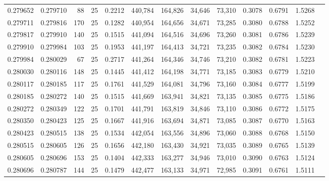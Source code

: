 \begin{tabular}{rrrrrrrrrrrrr}
0.279652 & 0.279710 &    88 &  25 &                                     0.2212 & 440,784 & 164,826 &  34,646 &  73,310 & 0.3078 & 0.6791 & 1.5268 \\
0.279711 & 0.279816 &   170 &  25 &                                     0.1282 & 440,954 & 164,656 &  34,671 &  73,285 & 0.3080 & 0.6788 & 1.5252 \\
0.279817 & 0.279910 &   140 &  25 &                                     0.1515 & 441,094 & 164,516 &  34,696 &  73,260 & 0.3081 & 0.6786 & 1.5239 \\
0.279910 & 0.279984 &   103 &  25 &                                     0.1953 & 441,197 & 164,413 &  34,721 &  73,235 & 0.3082 & 0.6784 & 1.5230 \\
0.279984 & 0.280029 &    67 &  25 &                                     0.2717 & 441,264 & 164,346 &  34,746 &  73,210 & 0.3082 & 0.6781 & 1.5223 \\
0.280030 & 0.280116 &   148 &  25 &                                     0.1445 & 441,412 & 164,198 &  34,771 &  73,185 & 0.3083 & 0.6779 & 1.5210 \\
0.280117 & 0.280185 &   117 &  25 &                                     0.1761 & 441,529 & 164,081 &  34,796 &  73,160 & 0.3084 & 0.6777 & 1.5199 \\
0.280185 & 0.280272 &   140 &  25 &                                     0.1515 & 441,669 & 163,941 &  34,821 &  73,135 & 0.3085 & 0.6775 & 1.5186 \\
0.280272 & 0.280349 &   122 &  25 &                                     0.1701 & 441,791 & 163,819 &  34,846 &  73,110 & 0.3086 & 0.6772 & 1.5175 \\
0.280350 & 0.280423 &   125 &  25 &                                     0.1667 & 441,916 & 163,694 &  34,871 &  73,085 & 0.3087 & 0.6770 & 1.5163 \\
0.280423 & 0.280515 &   138 &  25 &                                     0.1534 & 442,054 & 163,556 &  34,896 &  73,060 & 0.3088 & 0.6768 & 1.5150 \\
0.280515 & 0.280605 &   126 &  25 &                                     0.1656 & 442,180 & 163,430 &  34,921 &  73,035 & 0.3089 & 0.6765 & 1.5139 \\
0.280605 & 0.280696 &   153 &  25 &                                     0.1404 & 442,333 & 163,277 &  34,946 &  73,010 & 0.3090 & 0.6763 & 1.5124 \\
0.280696 & 0.280787 &   144 &  25 &                                     0.1479 & 442,477 & 163,133 &  34,971 &  72,985 & 0.3091 & 0.6761 & 1.5111 \\

\end{tabular}
